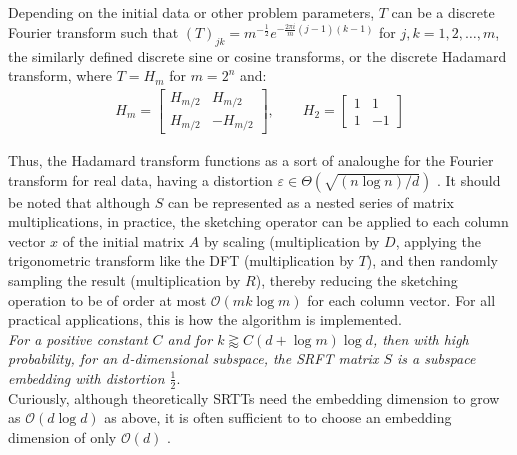 \documentclass{article}
\newcommand{\bO}{\mathcal{O}}
\begin{document}
Depending on the initial data or other problem parameters, $T$ can be a discrete Fourier transform such that $(T)_{jk} = m^{-\frac12}e^{-\frac{2\pi i}{m}(j-1)(k-1)}$ for $j, k = 1, 2, \dots, m$, the similarly defined discrete sine or cosine transforms, or the discrete Hadamard transform, where $T = H_m$ for $m = 2^n$ and:\\
\begin{align*}
    H_m = \begin{bmatrix} H_{m/2} & H_{m/2} \\ H_{m/2} & -H_{m/2} \end{bmatrix}, \qquad H_2 =  \begin{bmatrix} 1 & 1 \\ 1 & -1 \end{bmatrix}
\end{align*}

Thus, the Hadamard transform functions as a sort of analoughe for the Fourier transform for real data, having a distortion $\varepsilon \in \Theta(\sqrt{(n \log n)/d})$ \cite{magdonismail2019fastfixeddimensionl2subspace}. It should be noted that although $S$ can be represented as a nested series of matrix multiplications, in practice, the sketching operator can be applied to each column vector $x$ of the initial matrix $A$ by scaling (multiplication by $D$, applying the trigonometric transform like the DFT (multiplication by $T$), and then randomly sampling the result (multiplication by $R$), thereby reducing the sketching operation to be of order at most $\bO(mk\log m)$ for each column vector. For all practical applications, this is how the algorithm is implemented.\\


\textit{For a positive constant $C$ and for $k \gtrapprox C (d + \log m) \log d$, then with high probability, for an $d$-dimensional subspace, the SRFT matrix $S$ is a subspace embedding with distortion $\frac12$}\cite{tropp_2023_0na16-j0x38}.\\

Curiously, although theoretically SRTTs need the embedding dimension to grow as $\bO (d \log d)$ as above, it is often sufficient to to choose an embedding dimension of only $\bO(d)$ \cite{martinsson2021randomizednumericallinearalgebra}.
\end{document}
